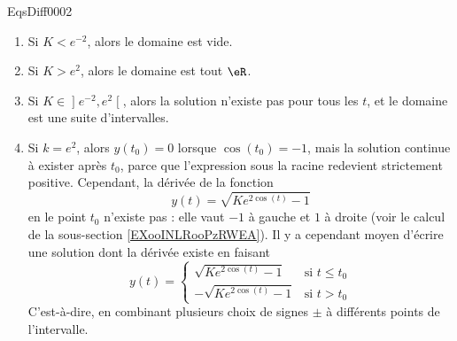 \begin{corrige}{EqsDiff0002}
\begin{enumerate}
\begin{enumerate}
\item
Si $K<e^{-2}$, alors le domaine est vide.
\item
Si $K>e^2$, alors le domaine est tout $\eR$.
\item
Si $K\in\mathopen]e^{-2},e^2\mathclose[$, alors la solution n'existe pas pour tous les $t$, et le domaine est une suite d'intervalles.
\item
Si $k=e^2$, alors $y(t_0)=0$ lorsque $\cos(t_0)=-1$, mais la solution continue à exister après $t_0$, parce que l'expression sous la racine redevient strictement positive. Cependant, la dérivée de la fonction
\begin{equation}
	y(t)=\sqrt{K e^{2\cos(t)}-1}
\end{equation}
en le point $t_0$ n'existe pas  : elle vaut $-1$ à gauche et $1$ à droite (voir le calcul de la sous-section \ref{EXooINLRooPzRWEA}). Il y a cependant moyen d'écrire une solution dont la dérivée existe en faisant
\begin{equation}
	y(t)=\begin{cases}
	\sqrt{Ke^{2\cos(t)}-1}	&	\text{si }t\leq t_0\\
	-\sqrt{Ke^{2\cos(t)}-1}		&	 \text{si }t> t_0
\end{cases}
\end{equation}
C'est-à-dire, en combinant plusieurs choix de signes $\pm$ à différents points de l'intervalle.

\end{enumerate}
\end{enumerate}

\end{corrige}
